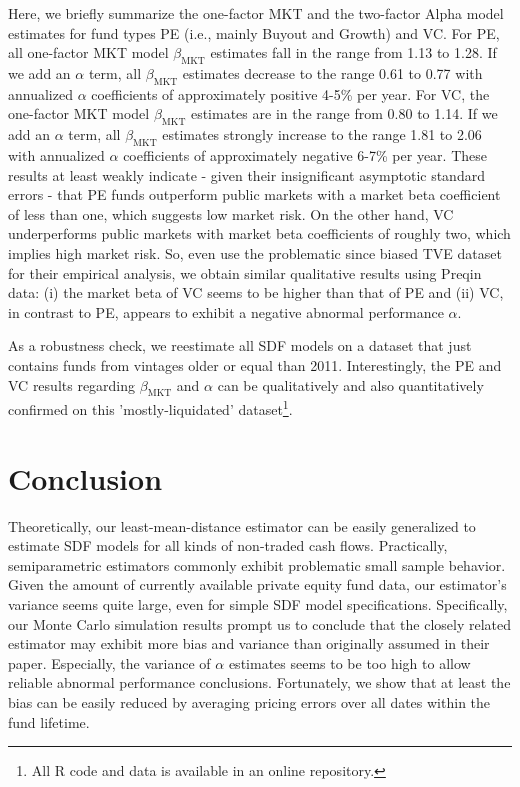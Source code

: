 \documentclass[12pt]{article}
\begin{document}
Here, we briefly summarize the one-factor MKT and the two-factor Alpha model estimates for fund types PE (i.e., mainly Buyout and Growth) and VC.
For PE, all one-factor MKT model $\beta_{\mathrm{MKT}}$ estimates fall in the range from 1.13 to 1.28. 
If we add an $\alpha$ term, all $\beta_{\mathrm{MKT}}$ estimates decrease to the range 0.61 to 0.77 with annualized $\alpha$ coefficients of approximately positive 4-5\% per year.
For VC, the one-factor MKT model $\beta_{\mathrm{MKT}}$ estimates are in the range from 0.80 to 1.14.
If we add an $\alpha$ term, all $\beta_{\mathrm{MKT}}$ estimates strongly increase to the range 1.81 to 2.06 with annualized $\alpha$ coefficients of approximately negative 6-7\% per year.
These results at least weakly indicate - given their insignificant asymptotic standard errors - that PE funds outperform public markets with a market beta coefficient of less than one, which suggests low market risk.
On the other hand, VC underperforms public markets with market beta coefficients of roughly two, which implies high market risk.
So, even \cite{DLP12} use the problematic since biased TVE dataset for their empirical analysis, we obtain similar qualitative results using Preqin data: (i) the market beta of VC seems to be higher than that of PE and (ii) VC, in contrast to PE, appears to exhibit a negative abnormal performance $\alpha$.

As a robustness check, we reestimate all SDF models on a dataset that just contains funds from vintages older or equal than 2011.
Interestingly, the PE and VC results regarding $\beta_{\mathrm{MKT}}$ and $\alpha$ can be qualitatively and also quantitatively confirmed on this 'mostly-liquidated' dataset\footnote{All R code and data is available in an online repository. %
}.




\section{Conclusion}
\label{sec:conclusion}

Theoretically, our least-mean-distance estimator can be easily generalized to estimate SDF models for all kinds of non-traded cash flows.
Practically, semiparametric estimators commonly exhibit problematic small sample behavior.
Given the amount of currently available private equity fund data, our estimator's variance seems quite large, even for simple SDF model specifications.
Specifically, our Monte Carlo simulation results prompt us to conclude that the closely related \cite{DLP12} estimator may exhibit more bias and variance than originally assumed in their paper.
Especially, the variance of $\alpha$ estimates seems to be too high to allow reliable abnormal performance conclusions.
Fortunately, we show that at least the bias can be easily reduced by averaging pricing errors over all dates within the fund lifetime.
\end{document}
